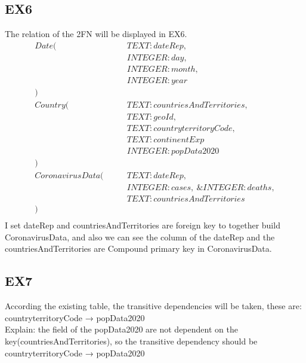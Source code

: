 \documentclass[]{article}
\begin{document}
\begin{titlepage}
		    \subsection{EX6}
		    The relation of the 2FN will be displayed in EX6.\\
		     \begin{align}
		    Date(\qquad&TEXT: dateRep,\\ &INTEGER: day,\\&INTEGER: month,\\&INTEGER: year\\)\\
		    Country(\qquad&TEXT: countriesAndTerritories,\\&TEXT: geoId,\\&TEXT: countryterritoryCode,\\&TEXT: continentExp\\&INTEGER: popData2020\\)\\
		    CoronavirusData(\qquad&TEXT: dateRep,\\&INTEGER: cases,\ \&INTEGER: deaths,\\&TEXT: countriesAndTerritories\\)\\
             \end{align}
             I set dateRep and countriesAndTerritories are foreign key to together build CoronavirusData, and also we can see the column of the dateRep and the countriesAndTerritories are Compound primary key in CoronavirusData.
		    \subsection{EX7}
		    According the existing table, the transitive dependencies will be taken, these are:\\
		    countryterritoryCode → popData2020\\
		    Explain: the field of the popData2020 are not dependent on the key(countriesAndTerritories), so the transitive dependency should be countryterritoryCode → popData2020

\end{titlepage}
\end{document}
